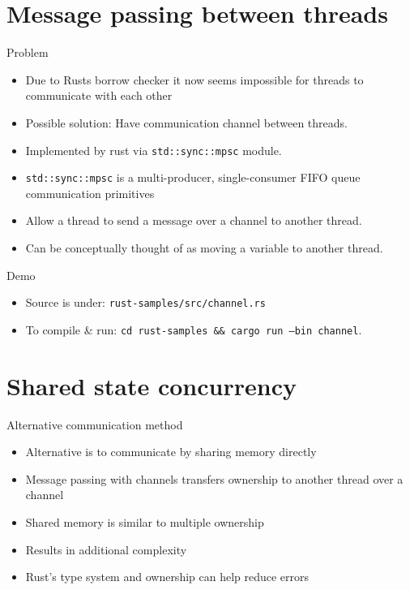 \documentclass{beamer}
\begin{document}
\section{Message passing between threads}
\begin{frame}{Problem}
    \begin{itemize}
        \item Due to Rusts borrow checker it now seems impossible for threads to communicate with each other
        \item Possible solution: Have communication channel between threads.
        \item Implemented by rust via \texttt{std::sync::mpsc} module.
        \item \texttt{std::sync::mpsc} is a multi-producer, single-consumer FIFO queue communication primitives
        \item Allow a thread to send a message over a channel to another thread.
        \item Can be conceptually thought of as moving a variable to another thread.
    \end{itemize}
\end{frame}

\begin{frame}{Demo}
     \begin{itemize}
        \item Source is under: \texttt{rust-samples/src/channel.rs}
        \item To compile \& run: \texttt{cd rust-samples \&\& cargo run --bin channel}.
    \end{itemize}
\end{frame}

\section{Shared state concurrency}

\begin{frame}{Alternative communication method}
    \begin{itemize}
        \item Alternative is to communicate by sharing memory directly
        \item Message passing with channels transfers ownership to another thread over a channel
        \item Shared memory is similar to multiple ownership
        \item Results in additional complexity
        \item Rust's type system and ownership can help reduce errors
    \end{itemize}
\end{frame}
\end{document}
